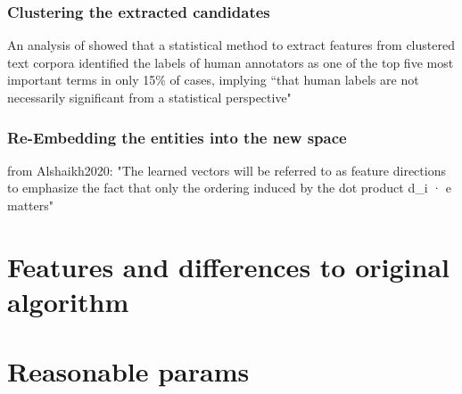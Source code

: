 \subsubsection{Clustering the extracted candidates}

An analysis of \cite{Carmel2009} showed that a statistical method to extract features from clustered text corpora identified the labels of human annotators as one of the top five most important terms in only 15\% of cases, implying ``that human labels are not necessarily significant from a statistical perspective" \cite[139]{Carmel2009}


\subsubsection{Re-Embedding the entities into the new space}

from Alshaikh2020: "The learned vectors will be referred to as feature directions to emphasize the fact that only the ordering induced by the dot product d_i · e matters"



\section{Features and differences to original algorithm}


\section{Reasonable params}

